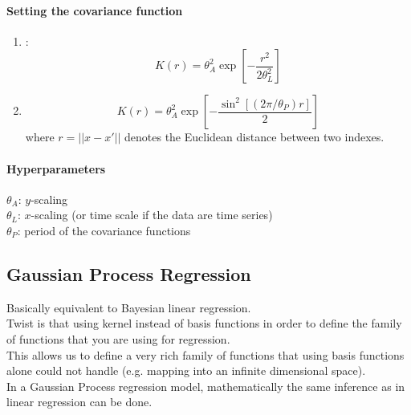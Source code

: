 \documentclass[11pt]{article}
\begin{document}
\paragraph{Setting the covariance function}
\begin{enumerate}
	\item {}:
$$K(r) = \theta_A^2 \exp[-\frac{r^2}{2\theta_L^2}]$$
\item {}
$$K(r) = \theta_A^2\exp[-\frac{\sin^2[(2\pi/\theta_P)r]}{2}]$$
where $r = ||x-x'||$ denotes the Euclidean distance between two indexes.
\end{enumerate}
\paragraph{Hyperparameters}
$\theta_A$:  $y$-scaling \\
$\theta_L$:  $x$-scaling (or time scale if the data are time series) \\
$\theta_P$:  period of the covariance functions \\
\subsection{Gaussian Process Regression}
Basically equivalent to Bayesian linear regression.\\
Twist is that using kernel instead of basis functions in order to define the family of functions that you are using for regression.\\
This allows us to define a very rich family of functions that using basis functions alone could not handle (e.g. mapping into an infinite dimensional space).\\
In a Gaussian Process regression model, mathematically the same inference as in linear regression can be done.
\end{document}
